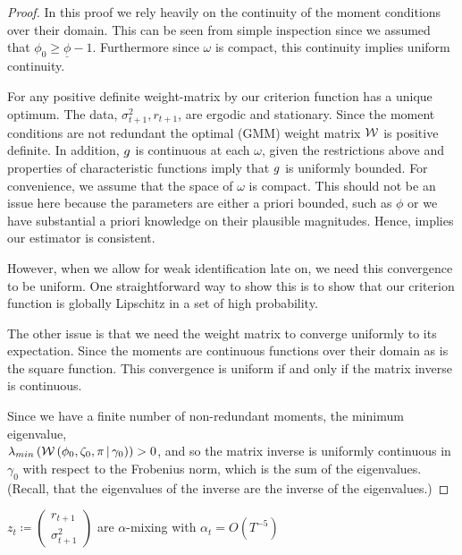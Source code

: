\documentclass[11pt, letterpaper, twoside, final]{article}
\begin{document}
\begin{appendices}
\begin{proof}
  In this proof we rely heavily on the continuity of the moment conditions over their domain. 
  This can be seen from simple inspection since we assumed that $\phi_0 \geq \underline{\phi} -1$.
  Furthermore since $\omega$ is compact, this continuity implies uniform continuity.
  
  For any positive definite weight-matrix by \textcite[Lemma 2.3]{newey1994large} our criterion function has
  a unique optimum.
  The data, $\sigma^2_{t+1}, r_{t+1}$, are ergodic and stationary.
  Since the moment conditions are not redundant the optimal (GMM) weight matrix $\mathcal{W}$ is positive definite. 
  In addition, $g$ is continuous at each $\omega$, given the restrictions above and properties of
  characteristic functions imply that $g$ is uniformly bounded. 
  For convenience, we assume that the space of $\omega$ is compact.
  This should not be an issue here because the parameters are either a priori bounded, such as $\phi$ or we
  have substantial a priori knowledge on their plausible magnitudes.
  Hence, \textcite[Theroem 2.6]{newey1994large} implies our estimator is consistent.
  
  However, when we allow for weak identification late on, we need this convergence to be uniform. 
  One straightforward way to show this is to show that our criterion function is globally Lipschitz in a set of
  high probability. 
  
  The other issue is that we need the weight matrix to converge uniformly to its expectation.
  Since the moments are continuous functions over their domain as is the square function.
  This convergence is uniform if and only if the matrix inverse is continuous.
    
    Since we have a finite number of non-redundant moments, the minimum eigenvalue, \\
    $\lambda_{min}\left(\mathcal{W}\left(\phi_0, \zeta_0, \pi \,\middle\vert\, \gamma_0\right)\right) > 0$, and so the matrix inverse
    is uniformly continuous in $\gamma_0$ with respect to the Frobenius norm, which is the sum of the eigenvalues.
    (Recall, that the eigenvalues of the inverse are the inverse of the eigenvalues.)


\end{proof}


\begin{assump}
    \label{assumption:weak_dependence}
    $z_t \coloneqq \begin{pmatrix} r_{t+1} \\ \sigma^2_{t+1} \end{pmatrix}$ are $\alpha$-mixing with $\alpha_t =
       O\left(T^{-5}\right)$
\end{assump}



\end{appendices}
\end{document}
